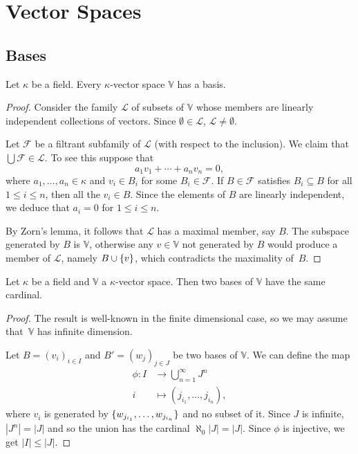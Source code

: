 \chapter{Vector Spaces}

\section{Bases}\label{chap:bases}

\begin{thm}
    Let\/ $\kappa$ be a field. Every\/ $\kappa$-vector space\/ $\mathbb V$ has a basis.
\end{thm}

\begin{proof}
    Consider the family $\mathcal L$ of subsets of $\mathbb V$ whose members are linearly independent collections of vectors. Since $\emptyset\in\mathcal L$, $\mathcal L\ne\emptyset$.

    Let $\mathcal F$ be a filtrant subfamily of $\mathcal L$ (with respect to the inclusion). We claim that $\bigcup\mathcal F\in\mathcal L$. To see this suppose that
    $$
        a_1v_1+\cdots+a_nv_n=0,
    $$
    where $a_1,\dots,a_n\in\kappa$ and $v_i\in B_i$ for some $B_i\in\mathcal F$. If $B\in\mathcal F$ satisfies $B_i\subseteq B$ for all $1\le i\le n$, then all the $v_i\in B$. Since the elements of $B$ are linearly independent, we deduce that $a_i=0$ for $1\le i\le n$.

    By Zorn's lemma, it follows that $\mathcal L$ has a maximal member, say $B$. The subspace generated by $B$ is $\mathbb V$, otherwise any $v\in\mathbb V$ not generated by $B$ would produce a member of $\mathcal L$, namely $B\cup\{v\}$, which contradicts the maximality of~$B$.
\end{proof}

\begin{thm}
    Let\/ $\kappa$ be a field and $\mathbb V$ a $\kappa$-vector space. Then two bases of $\mathbb V$ have the same cardinal.
\end{thm}

\begin{proof}
    The result is well-known in the finite dimensional case, so we may assume that~$\mathbb V$ has infinite dimension.

    Let $B=(v_i)_{i\in I}$ and $B'=(w_j)_{j\in J}$ be two bases of $\mathbb V$. We can define the map
    \begin{align*}
        \phi\colon I&\to\bigcup_{n=1}^\infty J^n\\
        i&\mapsto(j_{i_1},\dots,j_{i_n}),
    \end{align*}
    where $v_i$ is generated by $\{w_{j_{i_1}},\dots,w_{j_{i_n}}\}$ and no subset of it. Since $J$ is infinite, $|J^n|=|J|$ and so the union has the cardinal $\aleph_0|J|=|J|$. Since $\phi$ is injective, we get $|I|\le|J|$.
\end{proof}
